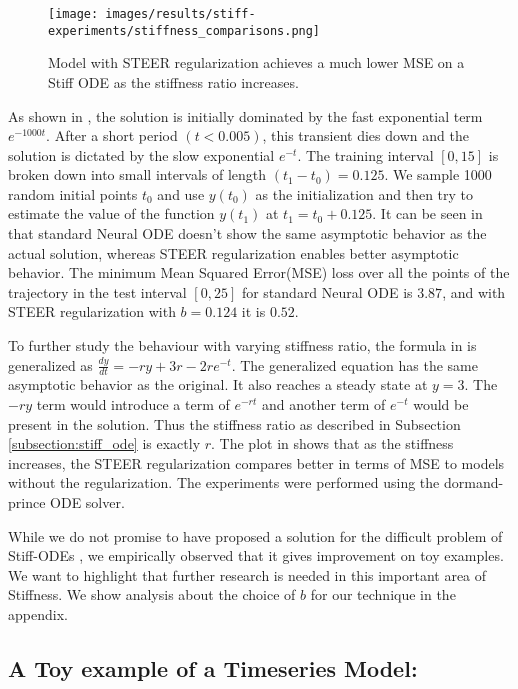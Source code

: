 \begin{figure}
	\centering
	\texttt{[image: images/results/stiff-experiments/stiffness\_comparisons.png]}
	\caption{Model with STEER regularization achieves a much lower MSE on a Stiff ODE as the stiffness ratio increases.} 
	\label{fig:stiffness_comparisons}
\end{figure}

As shown in , the solution is initially dominated by the fast exponential term $e^{-1000t}$. After a short period $(t<0.005)$, this transient dies down and the solution is dictated by the slow exponential $e^{-t}$. 
The training interval $[0,15]$ is broken down into small intervals of length $(t_1-t_0)=0.125$. We sample 1000 random initial points $t_0$ and use $y(t_0)$ as the initialization and then try to estimate the value of the function $y(t_1)$ at $t_1=t_0+0.125$.
It can be seen in  that standard Neural ODE doesn't show the same asymptotic behavior as the actual solution, whereas STEER regularization enables better asymptotic behavior. The minimum Mean Squared Error(MSE) loss over all the points of the trajectory in the test interval $[0,25]$ for standard Neural ODE is $3.87$, and with STEER regularization with $b=0.124$ it is $0.52$. 


To further study the behaviour with varying stiffness ratio, the formula in  is generalized as $\frac{dy}{dt}= -ry + 3r - 2re^{-t}$. The generalized equation has the same asymptotic behavior as the original. It also reaches a steady state at $y=3$. The $-ry$ term would introduce a term of $e^{-rt}$ and another term of $e^{-t}$ would be present in the solution. Thus the stiffness ratio as described in Subsection \ref{subsection:stiff_ode} is exactly $r$. The plot in  shows that as the stiffness increases, the STEER regularization compares better in terms of MSE to models without the regularization. The experiments were performed using the dormand-prince \cite{dormand1980family} ODE solver.

While we do not promise to have proposed a solution for the difficult problem of Stiff-ODEs \cite{chapra2010numerical}, we empirically observed that it gives improvement on toy examples. We want to highlight that further research is needed in this important area of Stiffness.
We show analysis about the choice of $b$ for our technique in the appendix.



\subsection{A Toy example of a Timeseries Model:}

